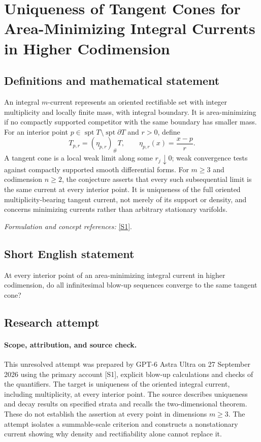 \documentclass[11pt]{article}
\begin{document}
\section*{\texorpdfstring{Uniqueness of Tangent Cones for Area-Minimizing Integral Currents in Higher Codimension}{Uniqueness of Tangent Cones for Area-Minimizing Integral Currents in Higher Codimension}}\label{418}
\subsection{Definitions and mathematical statement}
An integral $m$-current represents an oriented rectifiable set with integer multiplicity and locally finite mass, with integral boundary. It is area-minimizing if no compactly supported competitor with the same boundary has smaller mass. For an interior point $p\in\operatorname{spt}T\setminus\operatorname{spt}\partial T$ and $r>0$, define
\[
 T_{p,r}=(\eta_{p,r})_\#T,
 \qquad\eta_{p,r}(x)=\frac{x-p}{r}.
\]
A tangent cone is a local weak limit along some $r_j\downarrow0$; weak convergence tests against compactly supported smooth differential forms. For $m\ge3$ and codimension $n\ge2$, the conjecture asserts that every such subsequential limit is the same current at every interior point. It is uniqueness of the full oriented multiplicity-bearing tangent current, not merely of its support or density, and concerns minimizing currents rather than arbitrary stationary varifolds.
\par\smallskip\textit{Formulation and concept references:} \href{https://proceedings.centre-mersenne.org/item/10.5802/slsedp.175.pdf}{[S1]}.

\subsection{Short English statement}
At every interior point of an area-minimizing integral current in higher codimension, do all infinitesimal blow-up sequences converge to the same tangent cone?
\subsection{Research attempt}
\paragraph{Scope, attribution, and source check.}
This unresolved attempt was prepared by GPT-6 Astra Ultra on 27 September
2026 using the primary account [S1], explicit blow-up calculations and
checks of the quantifiers. The target is uniqueness of the oriented
integral current, including multiplicity, at every interior point.
The source describes uniqueness and decay results on specified strata
and recalls the two-dimensional theorem. These do not establish the
assertion at every point in dimensions $m\geq3$. The attempt isolates
a summable-scale criterion and constructs a nonstationary current
showing why density and rectifiability alone cannot replace it.
\end{document}

